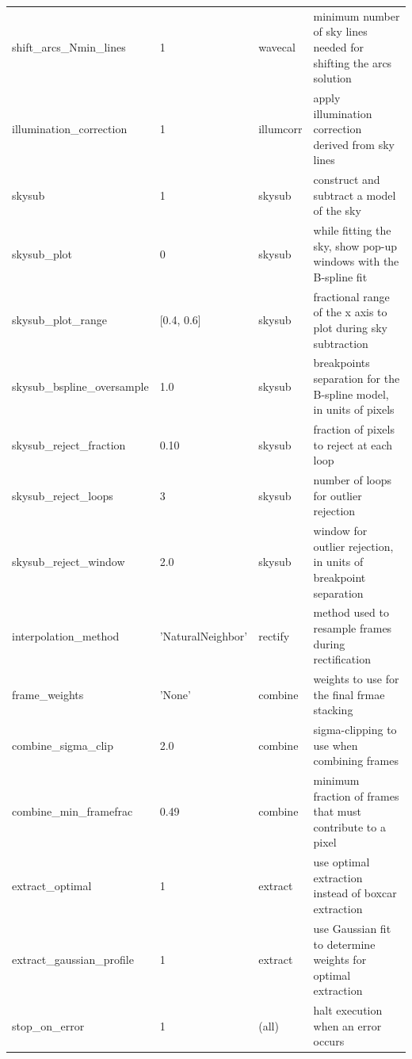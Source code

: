 \documentclass[a4paper]{article}
\begin{document}
\begin{sloppypar}
\begin{table}
{\begin{tabular}{llll}
    shift\_arcs\_Nmin\_lines      & 1             & wavecal          & minimum number of sky lines needed for shifting the arcs solution \\
    illumination\_correction      & 1             & illumcorr        & apply illumination correction derived from sky lines \\
    skysub                        & 1             & skysub           & construct and subtract a model of the sky \\
    skysub\_plot                  & 0             & skysub           & while fitting the sky, show pop-up windows with the B-spline fit \\
    skysub\_plot\_range           & [0.4, 0.6]    & skysub           & fractional range of the x axis to plot during sky subtraction \\
    skysub\_bspline\_oversample   & 1.0           & skysub           & breakpoints separation for the B-spline model, in units of pixels \\
    skysub\_reject\_fraction      & 0.10          & skysub           & fraction of pixels to reject at each loop \\
    skysub\_reject\_loops         & 3             & skysub           & number of loops for outlier rejection \\
    skysub\_reject\_window        & 2.0           & skysub           & window for outlier rejection, in units of breakpoint separation \\
    interpolation\_method         & 'NaturalNeighbor'  & rectify     & method used to resample frames during rectification \\
    frame\_weights                & 'None'        & combine          & weights to use for the final frmae stacking \\
    combine\_sigma\_clip          & 2.0           & combine          & sigma-clipping to use when combining frames \\
    combine\_min\_framefrac       & 0.49          & combine          & minimum fraction of frames that must contribute to a pixel \\
    extract\_optimal              & 1             & extract          & use optimal extraction instead of boxcar extraction \\
    extract\_gaussian\_profile    & 1             & extract          & use Gaussian fit to determine weights for optimal extraction \\
    stop\_on\_error               & 1             & (all)            & halt execution when an error occurs \\
    \hline
  \end{tabular}
  }
\end{table}





\end{sloppypar}
\end{document}
